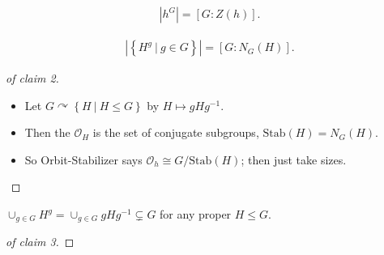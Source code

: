 \begin{solution}

\envlist

\begin{claim}[1]

\begin{align*}
{\left\lvert {h^G} \right\rvert} = [G: Z(h)]
.\end{align*}

\end{claim}

\begin{claim}[2]

\begin{align*}
{\left\lvert {\left\{{H^g {~\mathrel{\Big|}~}g\in G}\right\}} \right\rvert} = [G: N_G(H)]
.\end{align*}

\end{claim}

\begin{proof}[of claim 2]

\envlist

\begin{itemize}
\tightlist
\item
  Let
  \(G\curvearrowright\left\{{H {~\mathrel{\Big|}~}H \leq G}\right\}\) by
  \(H \mapsto gHg^{-1}\).
\item
  Then the \(\mathcal O_H\) is the set of conjugate subgroups,
  \(\mathrm{Stab}(H) = N_G(H)\).
\item
  So Orbit-Stabilizer says \(\mathcal O_h \cong G/\mathrm{Stab}(H)\);
  then just take sizes.
\end{itemize}

\end{proof}

\begin{claim}[3]

\(\cup_{g\in G} H^g = \cup_{g\in G} gHg^{-1}\subsetneq G\) for any
proper \(H \leq G\).

\end{claim}

\begin{proof}[of claim 3]


\end{proof}
\end{solution}
